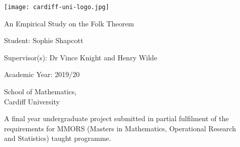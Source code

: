 \begin{titlepage}
	\begin{center}
		\vspace*{0.5cm}
		\texttt{[image: cardiff-uni-logo.jpg]}

		\vspace{1cm}

		\huge
		An Empirical Study on the Folk Theorem

		\vspace{2cm}

		\large
		Student: Sophie Shapcott

		\vspace{0.5cm}

		Supervisor{(s)}: Dr Vince Knight and Henry Wilde 

		\vspace{0.5cm}

		Academic Year: 2019/20
		
		\vspace{0.5cm}

		School of Mathematics, \\Cardiff University

		\vfill

		\normalsize
		A final year undergraduate project submitted in partial fulfilment of the\\ requirements for MMORS (Masters in Mathematics, Operational Research\\ and Statistics) taught programme.

	\end{center}
\end{titlepage}
